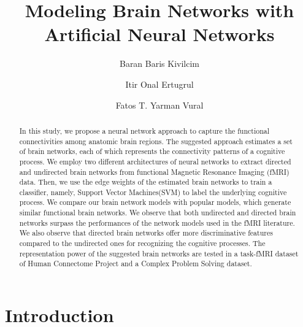 \documentclass[runningheads]{llncs}
\begin{document}
\title{Modeling Brain Networks with Artificial Neural Networks}

\author{Baran Baris Kivilcim \and
Itir Onal Ertugrul \and
Fatos T. Yarman Vural}


\maketitle              %
\begin{abstract}

In this study, we propose a neural network approach to capture the functional connectivities among anatomic brain regions. The suggested approach estimates a set of brain networks, each of which represents the connectivity patterns of a cognitive process. We employ two different architectures of neural networks to extract directed and undirected brain networks from functional Magnetic Resonance Imaging (fMRI) data. Then, we use the edge weights of the estimated brain networks to train a classifier, namely, Support Vector Machines(SVM) to label the underlying cognitive process. We compare our brain network models with popular models, which generate similar functional brain networks. We observe that both undirected and directed brain networks surpass the performances of the network models used in the fMRI literature. We also observe that directed brain networks offer more discriminative features compared to the undirected ones for  recognizing the cognitive processes. The representation power of the suggested brain networks are tested in a task-fMRI dataset of Human Connectome Project and a Complex Problem Solving dataset.


\end{abstract}

\section{Introduction}
\end{document}
